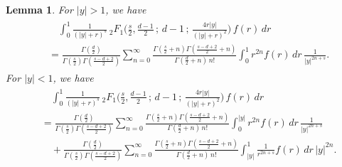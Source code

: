 \documentclass[10pt]{amsart}
\theoremstyle{plain}
\newtheorem{lem}[thm]{Lemma}
\theoremstyle{remark}
\numberwithin{equation}{section}
\begin{document}
\begin{lem} \label{Lem_integral expansion gen}
For $|y|>1$, we have 
\begin{align}
\begin{split}\label{2.8a}
& \quad \int_{ 0 }^1    \frac{1}{(|y|+r)^s}    \, {}_2F_1\Big(  \frac{s}{2}, \frac{d-1}{2} \, ; \, d-1 \, ; \,   \frac{4r|y|}{(|y|+r)^2} \Big)\, f(r) \,dr 
\\
& =   \frac{ \Gamma( \frac{d}{2} ) }{ \Gamma(\frac{s}{2}) \Gamma( \frac{s-d+2}{2} )  }    \sum_{n=0}^\infty \frac{ \Gamma(\frac{s}{2}+n) \Gamma( \frac{s-d+2}{2}+n )  }{ \Gamma(\frac{d}{2}+n) \, n! } \int_0^1   r^{ 2n }  f(r)\,dr\, \frac{1}{|y|^{2n+s}}. 
\end{split}
\end{align}
For $|y|<1$, we have 
\begin{align}
\begin{split}
&\quad \int_{ 0 }^1    \frac{1}{(|y|+r)^s}    \, {}_2F_1\Big(  \frac{s}{2}, \frac{d-1}{2} \, ; \, d-1 \, ; \,   \frac{4r|y|}{(|y|+r)^2} \Big)\, f(r) \,dr 
\\
&=  \frac{ \Gamma( \frac{d}{2} ) }{ \Gamma(\frac{s}{2}) \Gamma( \frac{s-d+2}{2} )  }    \sum_{n=0}^\infty \frac{ \Gamma(\frac{s}{2}+n) \Gamma( \frac{s-d+2}{2}+n )  }{ \Gamma(\frac{d}{2}+n) \, n! } \int_0^{|y|}  r^{ 2n }  f(r)\,dr\, \frac{1}{|y|^{2n+s}}
\\
&\quad +  \frac{ \Gamma( \frac{d}{2} ) }{ \Gamma(\frac{s}{2}) \Gamma( \frac{s-d+2}{2} )  } \sum_{n=0}^\infty \frac{ \Gamma(\frac{s}{2}+n) \Gamma( \frac{s-d+2}{2}+n )  }{ \Gamma(\frac{d}{2}+n) \, n! }  \int_{|y|}^{1} \frac{1}{r^{2n+s}} f(r) \,dr \, |y|^{2n}. 
\end{split}
\end{align}
\end{lem}
 
\end{document}
